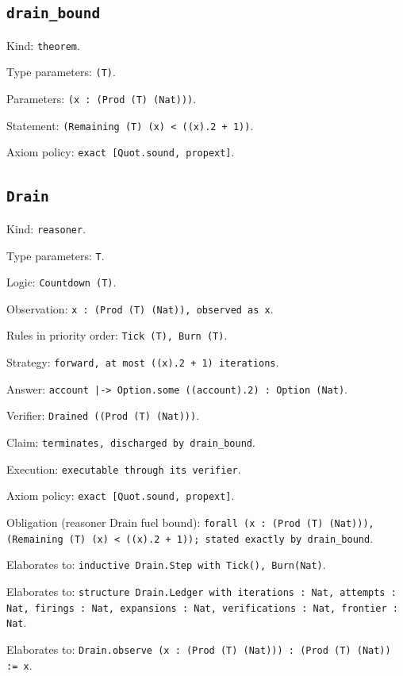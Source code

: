 \documentclass[11pt]{article}
\begin{document}
\subsection*{\texttt{drain\_bound}}
\noindent Kind: \texttt{theorem}.\par
\noindent Type parameters: \texttt{(T)}.\par
\noindent Parameters: \texttt{(x : (Prod (T) (Nat)))}.\par
\noindent Statement: \texttt{(Remaining (T) (x) < ((x).2 + 1))}.\par
\noindent Axiom policy: \texttt{exact [Quot.sound, propext]}.\par
\subsection*{\texttt{Drain}}
\noindent Kind: \texttt{reasoner}.\par
\noindent Type parameters: \texttt{T}.\par
\noindent Logic: \texttt{Countdown (T)}.\par
\noindent Observation: \texttt{x : (Prod (T) (Nat)), observed as x}.\par
\noindent Rules in priority order: \texttt{Tick (T), Burn (T)}.\par
\noindent Strategy: \texttt{forward, at most ((x).2 + 1) iterations}.\par
\noindent Answer: \texttt{account |-> Option.some ((account).2) : Option (Nat)}.\par
\noindent Verifier: \texttt{Drained ((Prod (T) (Nat)))}.\par
\noindent Claim: \texttt{terminates, discharged by drain\_bound}.\par
\noindent Execution: \texttt{executable through its verifier}.\par
\noindent Axiom policy: \texttt{exact [Quot.sound, propext]}.\par
\noindent Obligation (reasoner Drain fuel bound): \texttt{forall (x : (Prod (T) (Nat))), (Remaining (T) (x) < ((x).2 + 1)); stated exactly by drain\_bound}.\par
\noindent Elaborates to: \texttt{inductive Drain.Step with Tick(), Burn(Nat)}.\par
\noindent Elaborates to: \texttt{structure Drain.Ledger with iterations : Nat, attempts : Nat, firings : Nat, expansions : Nat, verifications : Nat, frontier : Nat}.\par
\noindent Elaborates to: \texttt{Drain.observe (x : (Prod (T) (Nat))) : (Prod (T) (Nat)) := x}.\par
\end{document}
